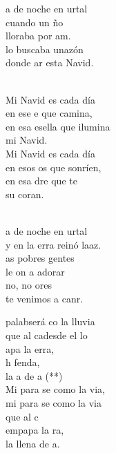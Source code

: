 \documentclass[12pt]{article}
\begin{document}
\begin{multicols*}{2}
\begin{cancion}[Mi Navidad][]%
	a de noche en urtal\\
	cuando un ño\\
	lloraba por am.\\
	lo buscaba unazón \\
	donde ar esta Navid.\\\jump\\
	\begin{chorus}%
	Mi Navid es cada día\\
	en ese e que camina,\\
	en esa esella que ilumina\\
	mi Navid.\\
	Mi Navid es cada día\\
	en esos os que sonríen,\\
	en esa dre que te \\
	su coran. \\
	\end{chorus}%
	\jump\\
	a de noche en urtal\\
	y en la erra reinó laaz.\\
	as pobres gentes\\
	le on a adorar\\
	no, no ores\\
	te venimos a canr.\\
\end{cancion}%

\begin{cancion}[Mi Palabra][Nico]%
	 palabserá co la lluvia\\
	que al cadesde el lo\\
	apa la erra,\\
	h fenda,\\
	la a de a (**)\\
	Mi para se como la via,\\
	mi para se como la via\\
	que al c  \\
	empapa la ra,\\
	la llena de a.\\
\end{cancion}%


\end{multicols*}
\end{document}
